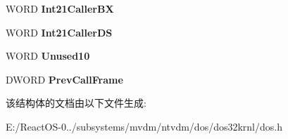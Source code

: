 \begin{DoxyCompactItemize}
W\+O\+RD {\bfseries Int21\+Caller\+BX}
\item 
\mbox{\label{struct___d_o_s___s_d_a_ab225ef7033681c07d78ee2f49ef4af9c}} 
W\+O\+RD {\bfseries Int21\+Caller\+DS}
\item 
\mbox{\label{struct___d_o_s___s_d_a_a2c265c7b736ea212b308bb3df48a5dbc}} 
W\+O\+RD {\bfseries Unused10}
\item 
\mbox{\label{struct___d_o_s___s_d_a_ab69b6f11dff4fa3b43c72b285e93139f}} 
D\+W\+O\+RD {\bfseries Prev\+Call\+Frame}
\end{DoxyCompactItemize}


该结构体的文档由以下文件生成\+:\begin{DoxyCompactItemize}
\item 
E\+:/\+React\+O\+S-\/0../subsystems/mvdm/ntvdm/dos/dos32krnl/dos.\+h\end{DoxyCompactItemize}
